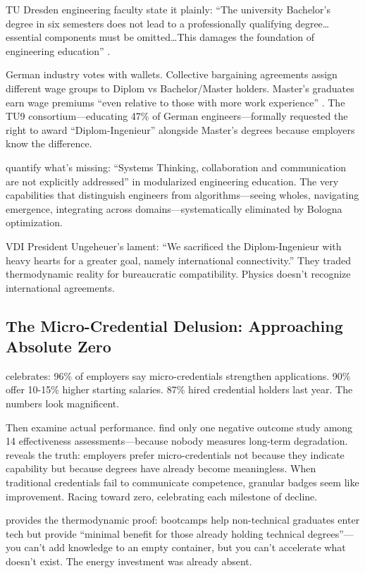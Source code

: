 TU Dresden engineering faculty state it plainly: ``The university Bachelor's degree in six semesters does not lead to a professionally qualifying degree\ldots essential components must be omitted\ldots This damages the foundation of engineering education'' \citep{odenbach2015}.

German industry votes with wallets. Collective bargaining agreements assign different wage groups to Diplom vs Bachelor/Master holders. Master's graduates earn wage premiums ``even relative to those with more work experience'' \citep{wieschke2020}. The TU9 consortium---educating 47\% of German engineers---formally requested the right to award ``Diplom-Ingenieur'' alongside Master's degrees because employers know the difference.

\citet{kaiser2022} quantify what's missing: ``Systems Thinking, collaboration and communication are not explicitly addressed'' in modularized engineering education. The very capabilities that distinguish engineers from algorithms---seeing wholes, navigating emergence, integrating across domains---systematically eliminated by Bologna optimization.

VDI President Ungeheuer's lament: ``We sacrificed the Diplom-Ingenieur with heavy hearts for a greater goal, namely international connectivity.'' They traded thermodynamic reality for bureaucratic compatibility. Physics doesn't recognize international agreements.

\subsection{The Micro-Credential Delusion: Approaching Absolute Zero}

\citet{lumina2025} celebrates: 96\% of employers say micro-credentials strengthen applications. 90\% offer 10-15\% higher starting salaries. 87\% hired credential holders last year. The numbers look magnificent.

Then examine actual performance. \citet{ha2022} find only one negative outcome study among 14 effectiveness assessments---because nobody measures long-term degradation. \citet{gauthier2020} reveals the truth: employers prefer micro-credentials not because they indicate capability but because degrees have already become meaningless. When traditional credentials fail to communicate competence, granular badges seem like improvement. Racing toward zero, celebrating each milestone of decline.

\citet{joshi2019} provides the thermodynamic proof: bootcamps help non-technical graduates enter tech but provide ``minimal benefit for those already holding technical degrees''---you can't add knowledge to an empty container, but you can't accelerate what doesn't exist. The energy investment was already absent.

